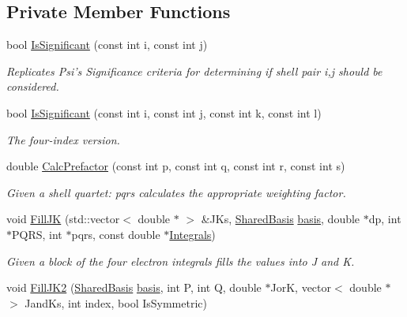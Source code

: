\subsection*{Private Member Functions}
\begin{DoxyCompactItemize}
\item 
bool \hyperlink{classJKBuilder_1_1PsiShared_a911b43dc1d1da86bfdbd45e86f4be122}{IsSignificant} (const int i, const int j)
\begin{DoxyCompactList}\small\item\em Replicates Psi's Significance criteria for determining if shell pair i,j should be considered. \item\end{DoxyCompactList}\item 
bool \hyperlink{classJKBuilder_1_1PsiShared_a0ec04bf57470f228eeb9e8f608014edf}{IsSignificant} (const int i, const int j, const int k, const int l)
\begin{DoxyCompactList}\small\item\em The four-\/index version. \item\end{DoxyCompactList}\item 
double \hyperlink{classJKBuilder_1_1PsiShared_af71d3f76014ba72b33336cef6ad2e397}{CalcPrefactor} (const int p, const int q, const int r, const int s)
\begin{DoxyCompactList}\small\item\em Given a shell quartet: pqrs calculates the appropriate weighting factor. \item\end{DoxyCompactList}\item 
void \hyperlink{classJKBuilder_1_1PsiShared_a4b5b1a33d6eb89835454c8b852a1e63b}{FillJK} (std::vector$<$ double $\ast$ $>$ \&JKs, \hyperlink{namespaceJKBuilder_aa50d645c83645be7de5fa94937abf1f3}{SharedBasis} \hyperlink{classJKBuilder_1_1PsiShared_a33250ff04c740919f41b0ffb6c78ada5}{basis}, double $\ast$dp, int $\ast$PQRS, int $\ast$pqrs, const double $\ast$\hyperlink{classJKBuilder_1_1Integrals}{Integrals})
\begin{DoxyCompactList}\small\item\em Given a block of the four electron integrals fills the values into J and K. \item\end{DoxyCompactList}\item 
void \hyperlink{classJKBuilder_1_1PsiShared_ac2d3bee6c0f963913d26d6cc3f7e2403}{FillJK2} (\hyperlink{namespaceJKBuilder_aa50d645c83645be7de5fa94937abf1f3}{SharedBasis} \hyperlink{classJKBuilder_1_1PsiShared_a33250ff04c740919f41b0ffb6c78ada5}{basis}, int P, int Q, double $\ast$JorK, vector$<$ double $\ast$ $>$ JandKs, int index, bool IsSymmetric)
\end{DoxyCompactItemize}
